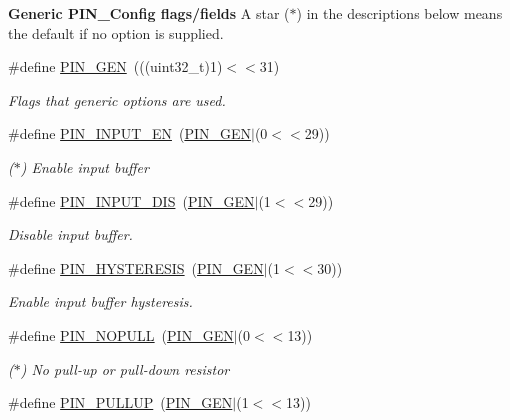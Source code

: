 \begin{Indent}{\bf Generic P\-I\-N\-\_\-\-Config flags/fields}
{A star ($\ast$) in the descriptions below means the default if no option is supplied. }\begin{DoxyCompactItemize}
\item 
\#define \hyperlink{_p_i_n_8h_ae1f7e47a17caab9697e69e5b9aff270b}{P\-I\-N\-\_\-\-G\-E\-N}~(((uint32\-\_\-t)1)$<$$<$31)
\begin{DoxyCompactList}\small\item\em Flags that generic options are used. \end{DoxyCompactList}\item 
\#define \hyperlink{_p_i_n_8h_a3cc36a3cdad818a5261bae5a2657a437}{P\-I\-N\-\_\-\-I\-N\-P\-U\-T\-\_\-\-E\-N}~(\hyperlink{_p_i_n_8h_ae1f7e47a17caab9697e69e5b9aff270b}{P\-I\-N\-\_\-\-G\-E\-N}$|$(0$<$$<$29))
\begin{DoxyCompactList}\small\item\em ($\ast$) Enable input buffer \end{DoxyCompactList}\item 
\#define \hyperlink{_p_i_n_8h_a1c8c8f99cf100a5d8745d879b18bd2b5}{P\-I\-N\-\_\-\-I\-N\-P\-U\-T\-\_\-\-D\-I\-S}~(\hyperlink{_p_i_n_8h_ae1f7e47a17caab9697e69e5b9aff270b}{P\-I\-N\-\_\-\-G\-E\-N}$|$(1$<$$<$29))
\begin{DoxyCompactList}\small\item\em Disable input buffer. \end{DoxyCompactList}\item 
\#define \hyperlink{_p_i_n_8h_a4113807b8b5acb98a84b26cc1730ad83}{P\-I\-N\-\_\-\-H\-Y\-S\-T\-E\-R\-E\-S\-I\-S}~(\hyperlink{_p_i_n_8h_ae1f7e47a17caab9697e69e5b9aff270b}{P\-I\-N\-\_\-\-G\-E\-N}$|$(1$<$$<$30))
\begin{DoxyCompactList}\small\item\em Enable input buffer hysteresis. \end{DoxyCompactList}\item 
\#define \hyperlink{_p_i_n_8h_a08ea493b755216db27b51a0402af862e}{P\-I\-N\-\_\-\-N\-O\-P\-U\-L\-L}~(\hyperlink{_p_i_n_8h_ae1f7e47a17caab9697e69e5b9aff270b}{P\-I\-N\-\_\-\-G\-E\-N}$|$(0$<$$<$13))
\begin{DoxyCompactList}\small\item\em ($\ast$) No pull-\/up or pull-\/down resistor \end{DoxyCompactList}\item 
\#define \hyperlink{_p_i_n_8h_a8dd57072ca956a8ace1ee869216dda0a}{P\-I\-N\-\_\-\-P\-U\-L\-L\-U\-P}~(\hyperlink{_p_i_n_8h_ae1f7e47a17caab9697e69e5b9aff270b}{P\-I\-N\-\_\-\-G\-E\-N}$|$(1$<$$<$13))

\end{DoxyCompactItemize}
\end{Indent}
